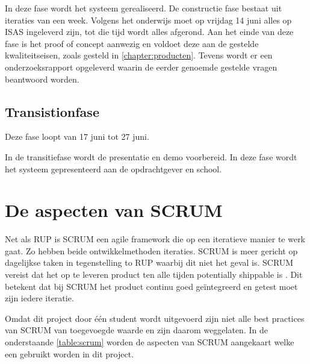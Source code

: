 \documentclass[a4paper, 11pt, oneside]{report}
\begin{document}
In deze fase wordt het systeem gerealiseerd. De constructie fase bestaat uit iteraties van een week.
Volgens het onderwijs moet op vrijdag 14 juni alles op ISAS ingeleverd zijn, tot die tijd wordt alles afgerond.
Aan het einde van deze fase is het proof of concept aanwezig en voldoet deze aan de gestelde kwaliteitseisen, zoals gesteld in \autoref{chapter:producten}.
Tevens wordt er een onderzoeksrapport opgeleverd waarin de eerder genoemde gestelde vragen beantwoord worden.

\subsection{Transistionfase}
Deze fase loopt van 17 juni tot 27 juni.

In de transitiefase wordt de presentatie en demo voorbereid. 
In deze fase wordt het systeem gepresenteerd aan de opdrachtgever en school.

\section{De aspecten van SCRUM}
Net als RUP is SCRUM een agile framework die op een iteratieve manier te werk gaat.
Zo hebben beide ontwikkelmethoden iteraties.
SCRUM is meer gericht op dagelijkse taken in tegenstelling to RUP waarbij dit niet het geval is.
SCRUM vereist dat het op te leveren product ten alle tijden potentially shippable is \cite{james}. 
Dit betekent dat bij SCRUM het product continu goed geïntegreerd en getest moet zijn iedere iteratie. 

Omdat dit project door één student wordt uitgevoerd zijn niet alle best practices van SCRUM van toegevoegde waarde en zijn daarom weggelaten.
In de onderstaande \autoref{table:scrum} worden de aspecten van SCRUM aangekaart welke een gebruikt worden in dit project.
\end{document}
